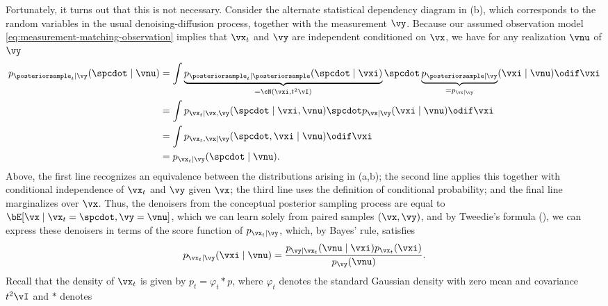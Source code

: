\documentclass[../../book-main.tex]{subfiles}
\begin{document}
Fortunately, it turns out that this is not necessary.
Consider the alternate statistical dependency diagram in
(b), which corresponds to the random variables
in the usual denoising-diffusion process, together with the measurement $\vy$.
Because our assumed observation model
\eqref{eq:measurement-matching-observation}
implies that $\vx_t$ and $\vy$ are independent conditioned on $\vx$, we have for
any realization $\vnu$ of $\vy$
\begin{equation}\label{eq:conditional-denoising-conditioning-order-irrelevant}
    \begin{split}
        p_{\posteriorsample_t\mid \vy}(\spcdot \mid \vnu)
        &= \int
        \underbrace{p_{\posteriorsample_t \mid
        \posteriorsample}(\spcdot\mid \vxi)}_{=
        \cN(\vxi, t^2 \vI)}
        \spcdot \underbrace{p_{\posteriorsample \mid \vy}}_{=
        p_{\vx\mid \vy}}(\vxi \mid
        \vnu)
        \odif \vxi
        \\
        &=
        \int p_{\vx_t \mid \vx, \vy}(\spcdot\mid \vxi, \vnu) \spcdot p_{\vx \mid
        \vy}(\vxi\mid \vnu) \odif \vxi
        \\
        &=
        \int p_{\vx_t, \vx \mid \vy}(\spcdot, \vxi \mid \vnu) \odif \vxi
        \\
        &= p_{\vx_t \mid \vy}(\spcdot\mid \vnu).
    \end{split}
\end{equation}
Above, the first line recognizes an equivalence between the distributions
arising in  (a,b); the second line applies this
together with conditional independence of $\vx_t$ and $\vy$ given $\vx$; the
third line uses the definition of conditional probability; and the final line
marginalizes over $\vx$.
Thus, the denoisers from the conceptual posterior sampling process are equal to
$\bE[\vx \mid \vx_t=\spcdot, \vy=\vnu]$, which we can learn solely
from paired samples $(\vx,
\vy)$,
and by Tweedie's formula (), we can express these denoisers in
terms of the score function of $p_{\vx_t \mid \vy}$, which, by Bayes' rule,
satisfies
\begin{equation}
    p_{\vx_t \mid \vy}(\vxi \mid \vnu)
    = \frac{p_{\vy \mid \vx_t}(\vnu \mid \vxi) p_{\vx_t}(\vxi)}{p_{\vy}(\vnu)}.
\end{equation}
Recall that the density of $\vx_t$ is
given by $p_t = \varphi_{t} \ast p$, where $\varphi_{t}$ denotes the standard
Gaussian density with zero mean and covariance $t^2 \vI$ and $\ast$ denotes
\end{document}

